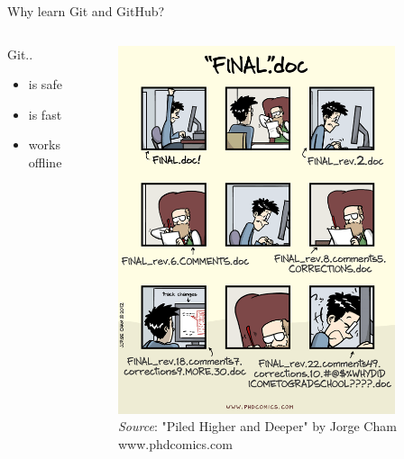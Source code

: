 \documentclass[handout]{beamer}
\begin{document}
\begin{frame}{Why learn Git and GitHub?}
\begin{columns}
\begin{column}{0.5\textwidth}
	Git..
	\begin{itemize}
		\item is safe
		\item is fast
		\item works offline
	\end{itemize}
\end{column}
\begin{column}{0.5\textwidth}
\begin{figure}
	\includegraphics[width=0.9\textwidth]{figures/final_phdcomics.png}
	\caption{\textit{Source}: "Piled Higher and Deeper" by Jorge Cham
www.phdcomics.com}
\end{figure}
\end{column}
\end{columns}
\end{frame}
\end{document}

